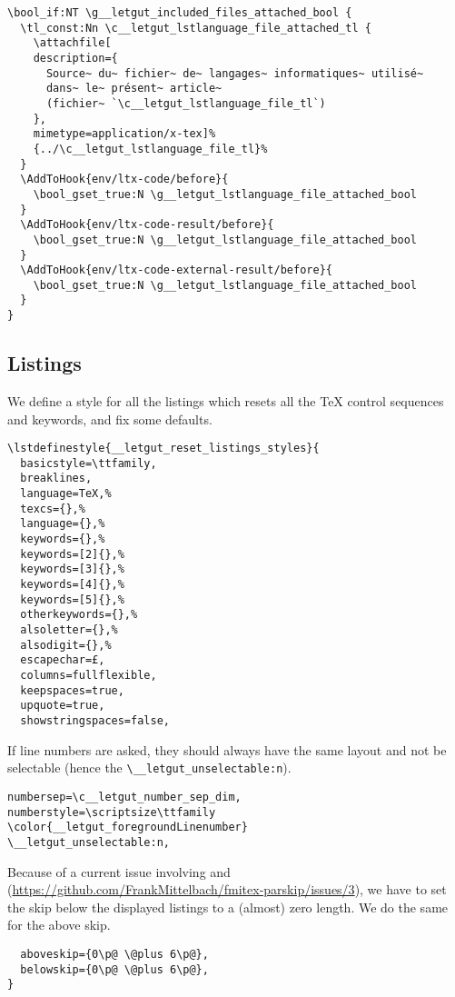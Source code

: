 \documentclass{letgut}
\begin{document}
\begin{lstlisting}
\bool_if:NT \g__letgut_included_files_attached_bool {
  \tl_const:Nn \c__letgut_lstlanguage_file_attached_tl {
    \attachfile[
    description={
      Source~ du~ fichier~ de~ langages~ informatiques~ utilisé~
      dans~ le~ présent~ article~
      (fichier~ `\c__letgut_lstlanguage_file_tl`)
    },
    mimetype=application/x-tex]%
    {../\c__letgut_lstlanguage_file_tl}%
  }
  \AddToHook{env/ltx-code/before}{
    \bool_gset_true:N \g__letgut_lstlanguage_file_attached_bool
  }
  \AddToHook{env/ltx-code-result/before}{
    \bool_gset_true:N \g__letgut_lstlanguage_file_attached_bool
  }
  \AddToHook{env/ltx-code-external-result/before}{
    \bool_gset_true:N \g__letgut_lstlanguage_file_attached_bool
  }
}
\end{lstlisting}

\subsection{Listings}
\label{ImplementationListings-514h55h0jlj0}
We define a style for all the listings which resets all the \TeX{} control
sequences and keywords, and fix some defaults.

\begin{lstlisting}
\lstdefinestyle{__letgut_reset_listings_styles}{
  basicstyle=\ttfamily,
  breaklines,
  language=TeX,%
  texcs={},%
  language={},%
  keywords={},%
  keywords=[2]{},%
  keywords=[3]{},%
  keywords=[4]{},%
  keywords=[5]{},%
  otherkeywords={},%
  alsoletter={},%
  alsodigit={},%
  escapechar=£,
  columns=fullflexible,
  keepspaces=true,
  upquote=true,
  showstringspaces=false,
\end{lstlisting}

If line numbers are asked, they should always have the same layout and not be
selectable (hence the \lstinline+\__letgut_unselectable:n+).

\begin{lstlisting}
numbersep=\c__letgut_number_sep_dim,
numberstyle=\scriptsize\ttfamily
\color{__letgut_foregroundLinenumber}
\__letgut_unselectable:n,
\end{lstlisting}

Because of a current issue involving  and 
(\url{https://github.com/FrankMittelbach/fmitex-parskip/issues/3}), we have to
set the skip below the displayed listings to a (almost) zero length. We do the
same for the above skip.

\begin{lstlisting}
  aboveskip={0\p@ \@plus 6\p@},
  belowskip={0\p@ \@plus 6\p@},
}
\end{lstlisting}
\end{document}
